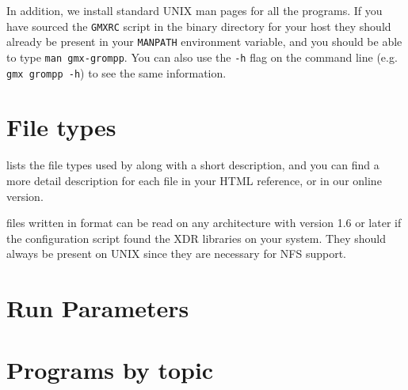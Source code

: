 In addition, we install standard UNIX man pages for all the programs. If
you have sourced the {\tt GMXRC} script in the {\gromacs} binary directory for
your host they should already be present in your {\tt MANPATH} environment variable, and you
should be able to type {\eg} {\tt man gmx-grompp}. You can also use
the {\tt -h} flag on the command line (e.g. {\tt gmx grompp -h}) to
see the same information.

\section{File types}
\label{sec:fileformats}
 lists the file types used by {\gromacs} along with
a short description, and you can find a more detail description for
each file in your HTML reference, or in our online version.

{\gromacs} files written in  format can be read on any
architecture with {\gromacs} version 1.6 or later if the configuration
script found the XDR libraries on your system. They should always be
present on UNIX since they are necessary for NFS support.



\section{Run Parameters}


\section{Programs by topic}


